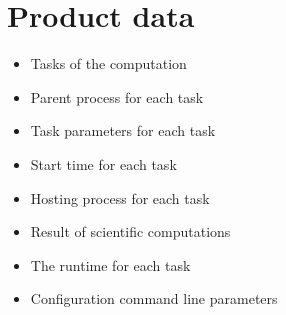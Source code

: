 {


\setcounter{funcD}{10}
\renewcommand{\labelitemi}{
	\ifnum \value{funcD}<10$/D 0\arabic{funcD} /$\addtocounter{funcD}{10}
	\else $/D \arabic{funcD} /$\addtocounter{funcD}{10}\fi
	}
\section{Product data}
	\begin{itemize}
		\item Tasks of the computation
		\item Parent process for each task
		\item Task parameters for each task
		\item Start time for each task
		\item Hosting process for each task
		\item Result of scientific computations
		\item The runtime for each task
		\item Configuration command line parameters
	\end{itemize}

}